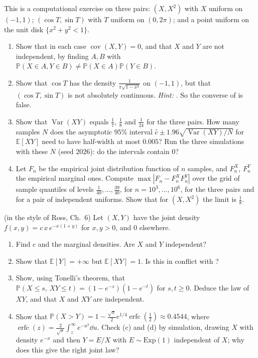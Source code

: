 \begin{exercise}\label{ex:pm-uncorrelated}
\medium This is a computational exercise on three pairs: $(X,X^2)$ with $X$ uniform on $(-1,1)$;
$(\cos T,\sin T)$ with $T$ uniform on $(0,2\pi)$; and a point uniform on the unit disk
$\{x^2+y^2<1\}$.
\begin{enumerate}[label=(\alph*)]
  \item Show that in each case $\operatorname{cov}(X,Y)=0$, and that $X$ and $Y$ are not
    independent, by finding $A,B$ with $\mathbb P(X\in A,Y\in B)\ne\mathbb P(X\in A)\mathbb P(Y\in B)$.
  \item Show that $\cos T$ has the density $\frac1{\pi\sqrt{1-x^2}}$ on $(-1,1)$, but that
    $(\cos T,\sin T)$ is not absolutely continuous. \emph{Hint:} .
    So the converse of  is false.
  \item Show that $\operatorname{Var}(XY)$ equals $\frac17$, $\frac18$ and $\frac1{24}$ for the
    three pairs. How many samples $N$ does the asymptotic $95\%$ interval
    $\hat c\pm1.96\sqrt{\operatorname{Var}(XY)/N}$ for $\mathbb E[XY]$ need to have half-width at
    most $0.005$? Run the three simulations with these $N$ (seed $2026$): do the intervals contain
    $0$?
  \item Let $F_n$ be the empirical joint distribution function of $n$ samples, and $F_n^X$,
    $F_n^Y$ the empirical marginal ones. Compute $\max|F_n-F_n^XF_n^Y|$ over the grid of sample
    quantiles of levels $\frac1{40},\dots,\frac{39}{40}$, for $n=10^3,\dots,10^6$, for the three
    pairs and for a pair of independent uniforms. Show that for $(X,X^2)$ the limit is
    $\frac18$.
\end{enumerate}
\end{exercise}

\begin{exercise}\label{ex:pm-joint-density}
\medium (in the style of Ross, Ch.~6) Let $(X,Y)$ have the joint density
$f(x,y)=c\,x\,e^{-x(1+y)}$ for $x,y>0$, and $0$ elsewhere.
\begin{enumerate}[label=(\alph*)]
  \item Find $c$ and the marginal densities. Are $X$ and $Y$ independent?
  \item Show that $\mathbb E[Y]=+\infty$ but $\mathbb E[XY]=1$. Is this in conflict with
    ?
  \item Show, using Tonelli's theorem, that
    $\mathbb P(X\le s,\,XY\le t)=(1-e^{-s})(1-e^{-t})$ for $s,t\ge0$. Deduce the law of $XY$,
    and that $X$ and $XY$ are independent.
  \item Show that $\mathbb P(X>Y)=1-\frac{\sqrt\pi}2e^{1/4}\operatorname{erfc}(\frac12)\approx0.4544$,
    where $\operatorname{erfc}(z)=\frac2{\sqrt\pi}\int_z^\infty e^{-u^2}\dd u$. Check (c) and (d) by
    simulation, drawing $X$ with density $e^{-x}$ and then $Y=E/X$ with $E\sim\mathrm{Exp}(1)$
    independent of $X$; why does this give the right joint law?
\end{enumerate}
\end{exercise}

